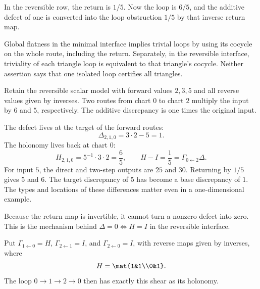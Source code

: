In the reversible row, the return is $1/5$. Now the loop is $6/5$, and the additive defect of one is converted into the loop obstruction $1/5$ by that inverse return map.

Global flatness in the minimal interface implies trivial loops by using its cocycle on the whole route, including the return. Separately, in the reversible interface, triviality of each triangle loop is equivalent to that triangle's cocycle. Neither assertion says that one isolated loop certifies all triangles.


Retain the reversible scalar model with forward values $2,3,5$ and all reverse values given by inverses. Two routes from chart $0$ to chart $2$ multiply the input by $6$ and $5$, respectively. The additive discrepancy is one times the original input.


The defect lives at the target of the forward routes:
\[
\Delta_{2,1,0}=3\cdot2-5=1.
\]
The holonomy lives back at chart $0$:
\[
H_{2,1,0}=5^{-1}\cdot3\cdot2=\frac65,
\qquad H-I=\frac15=\Gamma_{0\leftarrow2}\Delta.
\]
For input $5$, the direct and two-step outputs are $25$ and $30$. Returning by $1/5$ gives $5$ and $6$. The target discrepancy of $5$ has become a base discrepancy of $1$. The types and locations of these differences matter even in a one-dimensional example.

Because the return map is invertible, it cannot turn a nonzero defect into zero. This is the mechanism behind $\Delta=0\Longleftrightarrow H=I$ in the reversible interface.


Put $\Gamma_{1\leftarrow0}=H$, $\Gamma_{2\leftarrow1}=I$, and $\Gamma_{2\leftarrow0}=I$, with reverse maps given by inverses, where
\[
H=\mat{1&1\\0&1}.
\]
The loop $0\to1\to2\to0$ then has exactly this shear as its holonomy.

